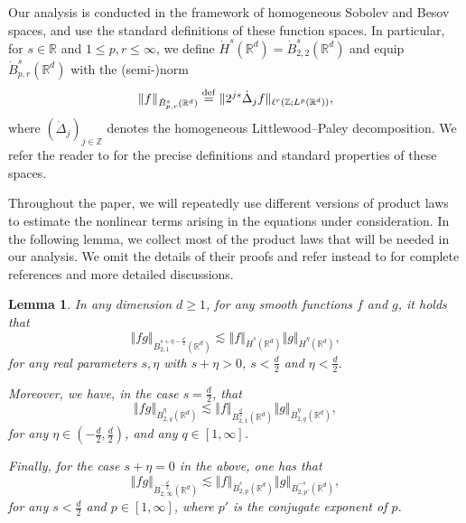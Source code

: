 \documentclass[11pt, leqno, a4paper,]{amsart}
\newcommand{\R}{\mathbb{R}}
\newtheorem{lemma}[theorem]{Lemma}
\theoremstyle{remark}
\numberwithin{equation}{section}
\newcommand*{\bydef}{\overset{\rm def}{=}}
\newcommand*{\norm}[1]{\left\Vert #1\right\Vert}
\begin{document}
Our analysis is conducted in the framework of homogeneous Sobolev and Besov spaces, and use the standard definitions of these function spaces. In particular, for $s\in\mathbb R$ and $1\leq p,r\leq\infty$, we define
$\dot H^s(\R^d)=\dot B^s_{2,2}(\R^d)$ and equip $\dot B^s_{p,r}(\R^d)$ with the  (semi-)norm
\begin{equation*}
	\|f\|_{\dot B^s_{p,r}(\mathbb R^d)}\bydef\|2^{js} \dot\Delta_jf \|_{\ell^r(\mathbb Z; L^p(\mathbb R^d))},
\end{equation*}
where $(\dot\Delta_j)_{j\in\mathbb Z}$ denotes the homogeneous Littlewood--Paley decomposition. We refer the reader to \cite{bcd11} for the precise definitions and standard properties of these spaces.


 Throughout the paper, we will repeatedly use different versions of product laws to estimate the nonlinear terms arising in the equations under consideration. In the following lemma, we collect most of the product laws that will be needed in our analysis. We omit the details of their proofs and refer instead to \cite{bcd11} for complete references and more detailed discussions. 

 

\begin{lemma}\label{lemma:product} In any dimension $d\geq 1$, for any smooth functions $f$ and $g$, it holds that 
	\begin{equation*}
		\norm {fg}_{\dot B^{s+\eta -\frac{d}{2}}_{2,1} (\mathbb R^d)} \lesssim \norm {f}_{\dot H^{s }(\mathbb R^d) }   \norm {g}_{\dot H^{\eta }(\mathbb R^d) }  ,
	\end{equation*}
	for any real parameters $s,\eta $ with  $s+\eta>0$, $ s< \frac{d}{2}$ and $ \eta< \frac{d}{2}$. 
	
	Moreover, we have, in the case $s=\frac{d}{2}$, that  
		\begin{equation*}
		\norm {fg}_{\dot B^{\eta  }_{2,q} (\mathbb R^d)} \lesssim \norm {f}_{ \dot B^{\frac{d}{2} }_{2,1}(\mathbb R^d) }   \norm {g}_{\dot B^{\eta  }_{2,q}(\mathbb R^d) }  ,
	\end{equation*} 
	for any $\eta \in (-\frac{d}{2}, \frac{d}{2})$, and any $q\in [1,\infty]$.
	
	Finally, for the case $s+\eta=0 $ in the above, one has that 
	\begin{equation*}
		\norm {fg}_{\dot B^{-\frac{d}{2} }_{2,\infty} (\mathbb R^d)} \lesssim \norm {f}_{ \dot B^{s }_{2,p}(\mathbb R^d) }   \norm {g}_{\dot B^{-s  }_{2,p'}(\mathbb R^d) }  ,
	\end{equation*} 
	for any $s<\frac{d}{2}$ and $p\in [1,\infty]$, where $p'$ is the conjugate exponent of $p$. 
 \end{lemma}
 
\end{document}
